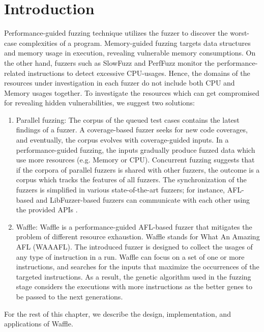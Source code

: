 \section{Introduction}

Performance-guided fuzzing technique utilizes the fuzzer to discover the worst-case complexities of a program. Memory-guided fuzzing targets data structures and memory usage in execution, revealing vulnerable memory consumptions. On the other hand, fuzzers such as SlowFuzz and PerfFuzz monitor the performance-related instructions to detect excessive CPU-usages. Hence, the domains of the resources under investigation in each fuzzer do not include both CPU and Memory usages together. To investigate the resources which can get compromised for revealing hidden vulnerabilities, we suggest two solutions:

\begin{enumerate}
    \item Parallel fuzzing: The corpus of the queued test cases contains the latest findings of a fuzzer. A coverage-based fuzzer seeks for new code coverages, and eventually, the corpus evolves with coverage-guided inputs. In a performance-guided fuzzing, the inputs gradually produce fuzzed data which use more resources (e.g. Memory or CPU). Concurrent fuzzing suggests that if the corpora of parallel fuzzers is shared with other fuzzers, the outcome is a corpus which tracks the features of all fuzzers. The synchronization of the fuzzers is simplified in various state-of-the-art fuzzers; for instance, AFL-based and LibFuzzer-based fuzzers can communicate with each other using the provided APIs \cite{afl_par}.
    
    \item Waffle: Waffle is a performance-guided AFL-based fuzzer that mitigates the problem of different resource exhaustion. Waffle stands for What An Amazing AFL (WAAAFL). The introduced fuzzer is designed to collect the usages of any type of instruction in a run. Waffle can focus on a set of one or more instructions, and searches for the inputs that maximize the occurrences of the targeted instructions. As a result, the genetic algorithm used in the fuzzing stage considers the executions with more instructions as the better genes to be passed to the next generations.
\end{enumerate}



For the rest of this chapter, we describe the design, implementation, and applications of Waffle.

